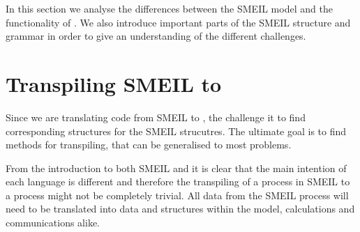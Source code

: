 


In this section we analyse the differences between the SMEIL model and the functionality of \cspm. We also introduce important parts of the SMEIL structure and grammar in order to give an understanding of the different challenges.

\section{Transpiling SMEIL to \cspm{}}
\label{sec:transpiling}
Since we are translating code from SMEIL to \cspm{}, the challenge it to find corresponding \cspm{} structures for the SMEIL strucutres. The ultimate goal is to find methods for transpiling, that can be generalised to most problems.

From the introduction to both SMEIL and \cspm it is clear that the main intention of each language is different and therefore the transpiling of a process in SMEIL to a \cspm process might not be completely trivial. All data from the SMEIL process will need to be translated into data and structures within the \cspm model, calculations and communications alike.







